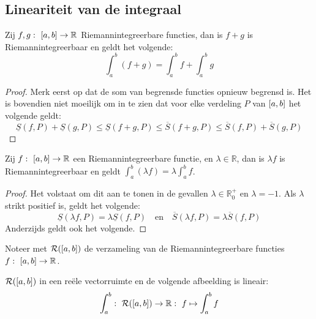 \documentclass[main.tex]{subfiles}
\begin{document}
\subsection{Lineariteit van de integraal}
\label{sec:lineariteit-van-de}

\begin{bpr}
  Zij $f,g:\ \interval{a}{b} \rightarrow \mathbb{R}$ Riemannintegreerbare functies, dan is $f+g$ is Riemannintegreerbaar en geldt het volgende:
  \[ \int_{a}^{b}(f+g) = \int_{a}^{b}f + \int_{a}^{b}g \]

  \begin{proof}
    Merk eerst op dat de som van begrensde functies opnieuw begrensd is.
    Het is bovendien niet moeilijk om in te zien dat voor elke verdeling $P$ van $\interval{a}{b}$ het volgende geldt:
    \[ \underline{S}(f,P) + \underline{S}(g,P) \le \underline{S}(f+g,P) \le \overline{S}(f+g,P) \le \overline{S}(f,P) + \overline{S}(g,P) \]
  \end{proof}
\end{bpr}

\begin{bpr}
  Zij $f:\ \interval{a}{b} \rightarrow \mathbb{R}$ een Riemannintegreerbare functie, en $\lambda \in \mathbb{R}$, dan is $\lambda f$ is Riemannintegreerbaar en geldt $\int_{a}^{b}(\lambda f) = \lambda \int_{a}^{b}f$.

  \begin{proof}
    Het volstaat om dit aan te tonen in de gevallen $\lambda \in\mathbb{R}_{0}^{+}$ en $\lambda = -1$.
    Als $\lambda$ strikt positief is, geldt het volgende:
    \[ \underline{S}(\lambda f,P) = \lambda \underline{S}(f,P) \quad\text{en}\quad \overline{S}(\lambda f,P) = \lambda \overline{S}(f,P) \]
    Anderzijds geldt ook het volgende.
  \end{proof}
\end{bpr}

\begin{de}
  Noteer met $\mathcal{R}(\interval{a}{b})$ de verzameling van de Riemannintegreerbare functies $f:\ \interval{a}{b} \rightarrow \mathbb{R}$.
\end{de}

\begin{bgev}
  $\mathcal{R}(\interval{a}{b})$ in een re\"ele vectorruimte en de volgende afbeelding is lineair:
  \[ \int_{a}^{b}:\ \mathcal{R}(\interval{a}{b}) \rightarrow \mathbb{R}:\ f \mapsto \int_{a}^{b}f \]
\end{bgev}
\end{document}
